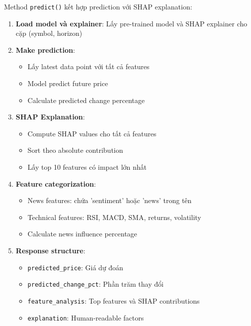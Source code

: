 Method \texttt{predict()} kết hợp prediction với SHAP explanation:

\begin{enumerate}
    \item \textbf{Load model và explainer}: Lấy pre-trained model và SHAP explainer cho cặp (symbol, horizon)
    
    \item \textbf{Make prediction}:
    \begin{itemize}
        \item Lấy latest data point với tất cả features
        \item Model predict future price
        \item Calculate predicted change percentage
    \end{itemize}
    
    \item \textbf{SHAP Explanation}:
    \begin{itemize}
        \item Compute SHAP values cho tất cả features
        \item Sort theo absolute contribution
        \item Lấy top 10 features có impact lớn nhất
    \end{itemize}
    
    \item \textbf{Feature categorization}:
    \begin{itemize}
        \item News features: chứa 'sentiment' hoặc 'news' trong tên
        \item Technical features: RSI, MACD, SMA, returns, volatility
        \item Calculate news influence percentage
    \end{itemize}
    
    \item \textbf{Response structure}:
    \begin{itemize}
        \item \texttt{predicted\_price}: Giá dự đoán
        \item \texttt{predicted\_change\_pct}: Phần trăm thay đổi
        \item \texttt{feature\_analysis}: Top features và SHAP contributions
        \item \texttt{explanation}: Human-readable factors
    \end{itemize}
\end{enumerate}

